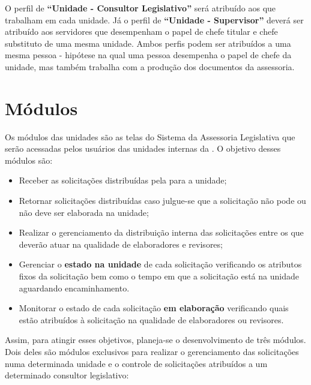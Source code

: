 
O perfil de \textbf{``Unidade - Consultor Legislativo''} será atribuído aos \CLs que trabalham em cada unidade. Já o perfil de \textbf{``Unidade - Supervisor''} deverá ser atribuído aos servidores que desempenham o papel de chefe titular e chefe substituto de uma mesma unidade. Ambos perfis podem ser atribuídos a uma mesma pessoa - hipótese na qual uma pessoa desempenha o papel de chefe da unidade, mas também trabalha com a produção dos documentos da assessoria.

\section{Módulos}

Os módulos das unidades são as telas do Sistema da Assessoria Legislativa que serão acessadas pelos usuários das unidades internas da \ASSEL. O objetivo desses módulos são:

\begin{itemize}
	\item Receber as solicitações distribuídas pela \ASSEL para a unidade;
	\item Retornar solicitações distribuídas caso julgue-se que a solicitação não pode ou não deve ser elaborada na unidade;
	\item Realizar o gerenciamento da distribuição interna das solicitações entre os \CLs que deverão atuar na qualidade de elaboradores e revisores;
	\item Gerenciar o \textbf{estado na unidade} de cada solicitação verificando os atributos fixos da solicitação bem como o tempo em que a solicitação está na unidade aguardando encaminhamento.	
	\item Monitorar o estado de cada solicitação \textbf{em elaboração} verificando quais \CLs estão atribuídos à solicitação na qualidade de elaboradores ou revisores.
\end{itemize}

Assim, para atingir esses objetivos, planeja-se o desenvolvimento de três módulos. Dois deles são módulos exclusivos para realizar o gerenciamento das solicitações numa determinada unidade e o controle de solicitações atribuídos a um determinado consultor legislativo:

